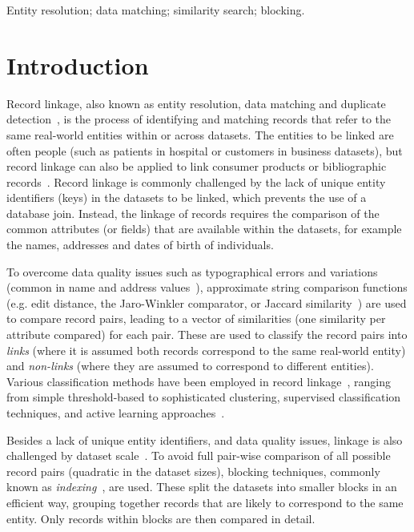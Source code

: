 \documentclass{llncs}
\begin{document}
\keywords Entity resolution; data matching; similarity search;
         blocking.


\section{Introduction}
\label{sec-intro}

Record linkage, also known as entity resolution, data matching and
duplicate detection~\cite{Chr12}, is the process of identifying and
matching records that refer to the same real-world entities within or
across datasets. The entities to be linked are often people (such as
patients in hospital or customers in business datasets), but record
linkage can also be applied to link consumer products or bibliographic
records~\cite{Chr12}. Record linkage is commonly challenged by the lack
of unique entity identifiers (keys) in the datasets to be linked, which
prevents the use of a database join. Instead, the linkage of records
requires the comparison of the common attributes (or fields) that are
available within the datasets, for example the names, addresses and
dates of birth of individuals.

To overcome data quality issues such as typographical errors and
variations (common in name and address values~\cite{Chr12}), approximate
string comparison functions (e.g. edit distance, the Jaro-Winkler
comparator, or Jaccard similarity~\cite{Chr12}) are used to compare
record pairs, leading to a vector of similarities (one similarity per
attribute compared) for each pair. These are used to classify the record
pairs into \emph{links} (where it is assumed both records correspond to
the same real-world entity) and \emph{non-links} (where they are assumed
to correspond to different entities). Various classification methods
have been employed in record linkage~\cite{Chr12,Don15}, ranging from
simple threshold-based to sophisticated clustering, supervised
classification techniques, and active learning approaches~\cite{Wan15}.

Besides a lack of unique entity identifiers, and data quality issues,
linkage is also challenged by dataset scale~\cite{Don15}. To avoid full
pair-wise comparison of all possible record pairs (quadratic in the
dataset sizes), blocking techniques, commonly known as
\emph{indexing}~\cite{Chr12b}, are used. These split the datasets into
smaller blocks in an efficient way, grouping together records that are
likely to correspond to the same entity. Only records within blocks are
then compared in detail.
\end{document}
